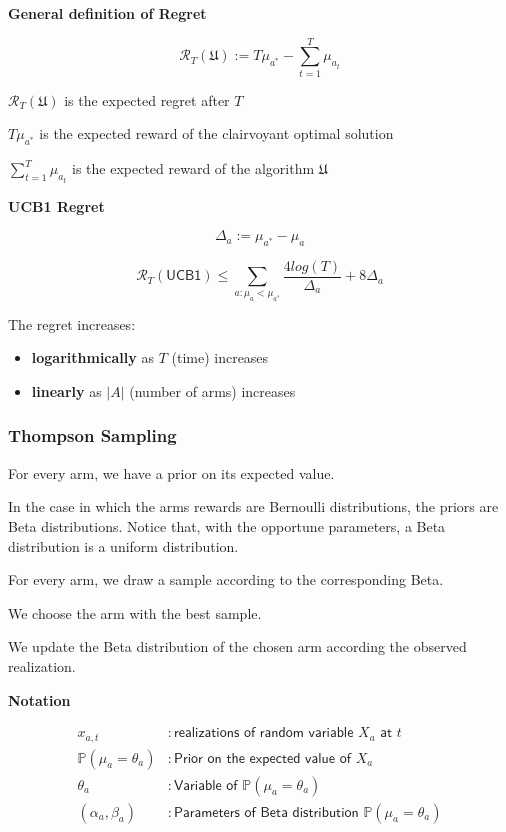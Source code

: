 \documentclass[10pt,a4paper]{article}
\begin{document}
\textbf{General definition of Regret}

$$\mathscr{R}_{T}(\mathfrak{U}) := T\mu_{a^*} - \sum_{t=1}^{T}{\mu_{a_t}}$$

$\mathscr{R}_{T}(\mathfrak{U})$ is the expected regret after $T$

$T\mu_{a^*}$ is the expected reward of the clairvoyant optimal solution

$\sum_{t=1}^{T}{\mu_{a_t}}$ is the expected reward of the algorithm $\mathfrak{U}$
\newline

\textbf{UCB1 Regret}

$$\Delta_{a} := \mu_{a^*} - \mu_{a}$$

$$\mathscr{R}_{T} (\mathsf{UCB1}) \leq \sum_{a: \mu_{a} < \mu_{a^{*}}} \frac{4 log(T)}{\Delta_{a}} + 8 \Delta_{a}$$

The regret increases:

\begin{itemize}
\item \textbf{logarithmically} as $T$ (time) increases
\item \textbf{linearly} as $|A|$ (number of arms) increases
\end{itemize}

\subsubsection{Thompson Sampling}\label{thompson-sampling}

For every arm, we have a prior on its expected value.

In the case in which the arms rewards are Bernoulli distributions, the priors are Beta distributions. Notice that, with the opportune parameters, a Beta distribution is a uniform distribution.

For every arm, we draw a sample according to the corresponding Beta.

We choose the arm with the best sample.

We update the Beta distribution of the chosen arm according the observed realization.
\newline

\textbf{Notation}

$$\begin{aligned}
x_{a,t} &: \textsf{realizations of random variable } X_a \textsf{ at } t\\
\mathbb{P}(\mu_a = \theta_a) &: \textsf{Prior on the expected value of } X_a \\
\theta_a &: \textsf{Variable of } \mathbb{P}(\mu_a = \theta_a) \\
(\alpha_a, \beta_a) &: \textsf{Parameters of Beta distribution } \mathbb{P}(\mu_a = \theta_a)
\end{aligned}$$
\newline
\end{document}
